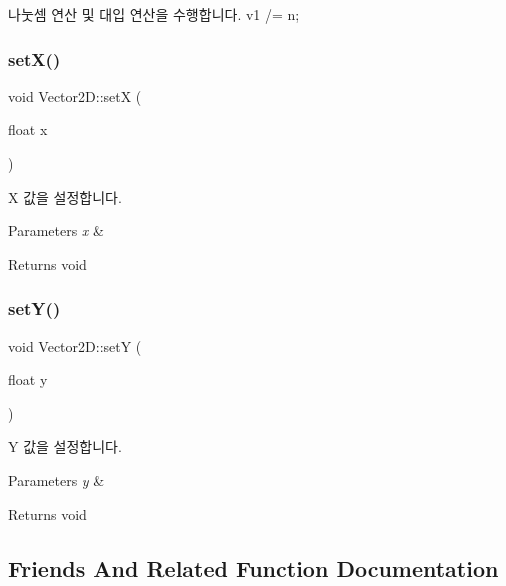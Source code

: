 나눗셈 연산 및 대입 연산을 수행합니다. v1 /= n; \mbox{\label{class_vector2_d_ac458bd997d2f0c6c7234cf1e8a7b73b8}} 
\subsubsection{\texorpdfstring{setX()}{setX()}}
{\footnotesize\ttfamily void Vector2\+D\+::setX (\begin{DoxyParamCaption}\item[{float}]{x }\end{DoxyParamCaption})\hspace{0.3cm}{\ttfamily [inline]}}

X 값을 설정합니다. 
\begin{DoxyParams}{Parameters}
{\em x} & \\
\hline
\end{DoxyParams}
\begin{DoxyReturn}{Returns}
void 
\end{DoxyReturn}
\mbox{\label{class_vector2_d_a9b47adcbdf2c10f3ba893285b5c34709}} 
\subsubsection{\texorpdfstring{setY()}{setY()}}
{\footnotesize\ttfamily void Vector2\+D\+::setY (\begin{DoxyParamCaption}\item[{float}]{y }\end{DoxyParamCaption})\hspace{0.3cm}{\ttfamily [inline]}}

Y 값을 설정합니다. 
\begin{DoxyParams}{Parameters}
{\em y} & \\
\hline
\end{DoxyParams}
\begin{DoxyReturn}{Returns}
void 
\end{DoxyReturn}


\subsection{Friends And Related Function Documentation}
\mbox{\label{class_vector2_d_a738ca24ea6760680730508dd1824b894}} 
